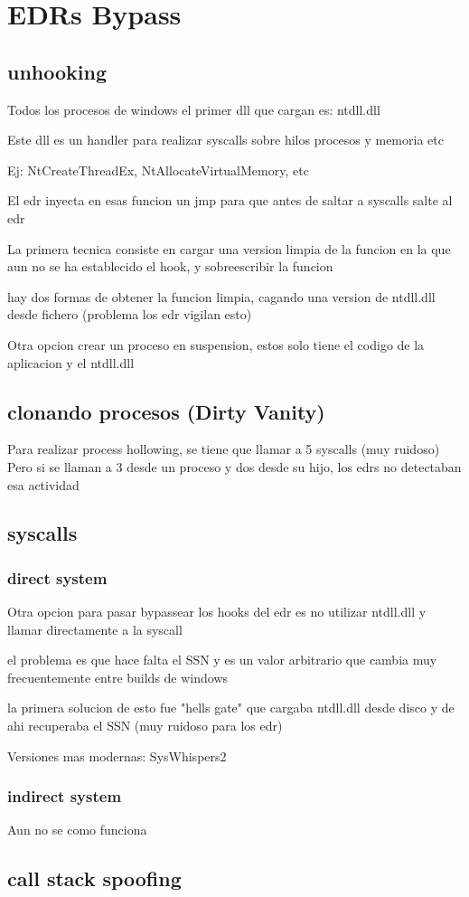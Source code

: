 \chapter{EDRs Bypass}

\section{unhooking}

Todos los procesos de windows el primer dll que cargan es: ntdll.dll 

Este dll es un handler para realizar syscalls sobre hilos procesos y memoria etc

Ej: NtCreateThreadEx, NtAllocateVirtualMemory, etc

El edr inyecta en esas funcion un jmp para que antes de saltar a syscalls salte 
al edr

La primera tecnica consiste en cargar una version limpia de la funcion en la que
aun no se ha establecido el hook, y sobreescribir la funcion

hay dos formas de obtener la funcion limpia, cagando una version de ntdll.dll
desde fichero (problema los edr vigilan esto)

Otra opcion crear un proceso en suspension, estos solo tiene el codigo de la
aplicacion y el ntdll.dll

\section{clonando procesos (Dirty Vanity)}

Para realizar process hollowing, se tiene que llamar a 5 syscalls (muy ruidoso)
Pero si se llaman a 3 desde un proceso y dos desde su hijo, los edrs no
detectaban esa actividad

\section{syscalls}


\subsection{direct system}

Otra opcion para pasar bypassear los hooks del edr es no utilizar ntdll.dll y 
llamar directamente a la syscall

el problema es que hace falta el SSN y es un valor arbitrario que cambia muy 
frecuentemente entre builds de windows

la primera solucion de esto fue "hells gate" que cargaba ntdll.dll desde disco
y de ahi recuperaba el SSN (muy ruidoso para los edr)

Versiones mas modernas: SysWhispers2

\subsection{indirect system}

Aun no se como funciona

\section{call stack spoofing}


